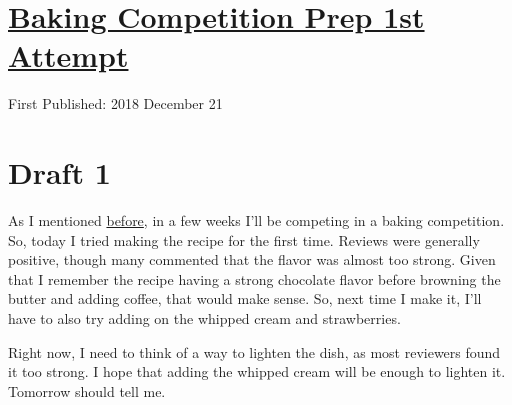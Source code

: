 \documentclass[12pt]{article}[titlepage]
\newcommand{\1}{\={a}}
\newcommand{\2}{\={e}}
\newcommand{\3}{\={\i}}
\newcommand{\4}{\=o}
\newcommand{\5}{\=u}
\newcommand{\6}{\={A}}
\renewcommand{\,}{\textsuperscript{,}}
\begin{document}
\doublespacing
\section{\href{baking-take-one.html}{Baking Competition Prep 1st Attempt}}
First Published: 2018 December 21
\section{Draft 1}
As I mentioned \href{baking-competition.html}{before}, in a few weeks I'll be competing in a baking competition.
So, today I tried making the recipe for the first time.
Reviews were generally positive, though many commented that the flavor was almost too strong.
Given that I remember the recipe having a strong chocolate flavor before browning the butter and adding coffee, that would make sense.
So, next time I make it, I'll have to also try adding on the whipped cream and strawberries.

Right now, I need to think of a way to lighten the dish, as most reviewers found it too strong.
I hope that adding the whipped cream will be enough to lighten it.
Tomorrow should tell me.
\end{document}
